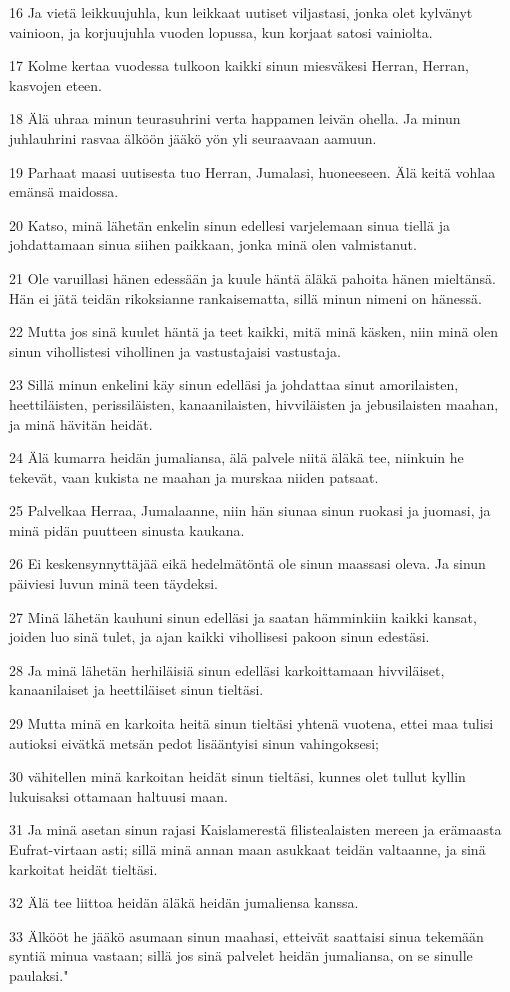\par 16 Ja vietä leikkuujuhla, kun leikkaat uutiset viljastasi, jonka olet kylvänyt vainioon, ja korjuujuhla vuoden lopussa, kun korjaat satosi vainiolta.
\par 17 Kolme kertaa vuodessa tulkoon kaikki sinun miesväkesi Herran, Herran, kasvojen eteen.
\par 18 Älä uhraa minun teurasuhrini verta happamen leivän ohella. Ja minun juhlauhrini rasvaa älköön jääkö yön yli seuraavaan aamuun.
\par 19 Parhaat maasi uutisesta tuo Herran, Jumalasi, huoneeseen. Älä keitä vohlaa emänsä maidossa.
\par 20 Katso, minä lähetän enkelin sinun edellesi varjelemaan sinua tiellä ja johdattamaan sinua siihen paikkaan, jonka minä olen valmistanut.
\par 21 Ole varuillasi hänen edessään ja kuule häntä äläkä pahoita hänen mieltänsä. Hän ei jätä teidän rikoksianne rankaisematta, sillä minun nimeni on hänessä.
\par 22 Mutta jos sinä kuulet häntä ja teet kaikki, mitä minä käsken, niin minä olen sinun vihollistesi vihollinen ja vastustajaisi vastustaja.
\par 23 Sillä minun enkelini käy sinun edelläsi ja johdattaa sinut amorilaisten, heettiläisten, perissiläisten, kanaanilaisten, hivviläisten ja jebusilaisten maahan, ja minä hävitän heidät.
\par 24 Älä kumarra heidän jumaliansa, älä palvele niitä äläkä tee, niinkuin he tekevät, vaan kukista ne maahan ja murskaa niiden patsaat.
\par 25 Palvelkaa Herraa, Jumalaanne, niin hän siunaa sinun ruokasi ja juomasi, ja minä pidän puutteen sinusta kaukana.
\par 26 Ei keskensynnyttäjää eikä hedelmätöntä ole sinun maassasi oleva. Ja sinun päiviesi luvun minä teen täydeksi.
\par 27 Minä lähetän kauhuni sinun edelläsi ja saatan hämminkiin kaikki kansat, joiden luo sinä tulet, ja ajan kaikki vihollisesi pakoon sinun edestäsi.
\par 28 Ja minä lähetän herhiläisiä sinun edelläsi karkoittamaan hivviläiset, kanaanilaiset ja heettiläiset sinun tieltäsi.
\par 29 Mutta minä en karkoita heitä sinun tieltäsi yhtenä vuotena, ettei maa tulisi autioksi eivätkä metsän pedot lisääntyisi sinun vahingoksesi;
\par 30 vähitellen minä karkoitan heidät sinun tieltäsi, kunnes olet tullut kyllin lukuisaksi ottamaan haltuusi maan.
\par 31 Ja minä asetan sinun rajasi Kaislamerestä filistealaisten mereen ja erämaasta Eufrat-virtaan asti; sillä minä annan maan asukkaat teidän valtaanne, ja sinä karkoitat heidät tieltäsi.
\par 32 Älä tee liittoa heidän äläkä heidän jumaliensa kanssa.
\par 33 Älkööt he jääkö asumaan sinun maahasi, etteivät saattaisi sinua tekemään syntiä minua vastaan; sillä jos sinä palvelet heidän jumaliansa, on se sinulle paulaksi."

